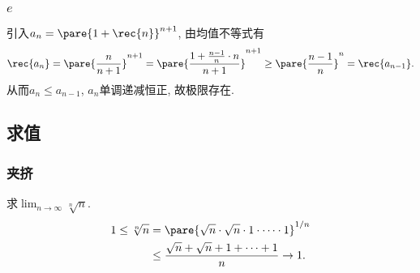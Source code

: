 \documentclass{ctexart}
\begin{document}
\subsubsection{\texorpdfstring{$e$}{e}} %
\label{ssub:e}

引入$\displaystyle a_n = \pare{1+\rec{n}}^{n+1}$, 由均值不等式有
\[ \rec{a_n} = \pare{\frac{n}{n+1}}^{n+1} = \pare{\frac{1+\frac{n-1}{n}\cdot n}{n+1}}^{n+1} \ge \pare{\frac{n-1}{n}}^n = \rec{a_{n-1}}. \]
从而$a_n\le a_{n-1}$, $a_n$单调递减恒正, 故极限存在.



\subsection{求值} %
\label{sub:求值}

\subsubsection{夹挤} %
\label{ssub:夹挤}

求$\displaystyle \lim_{n\rightarrow \infty} \sqrt[n]{n}$.
\begin{align*}
    1 \le \sqrt[n]{n} &= \pare{\sqrt{n}\cdot\sqrt{n}\cdot 1 \cdot\cdots\cdot 1}^{1/n} \\
    &\le \frac{\sqrt{n}+\sqrt{n}+1+\cdots+1}{n} \rightarrow 1.
\end{align*}



\end{document}
